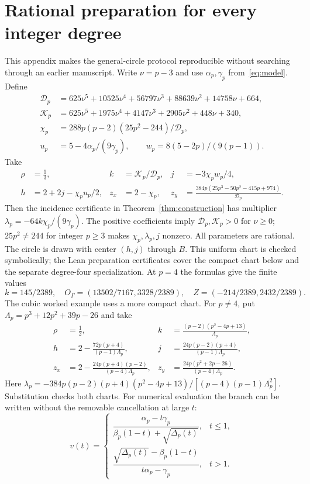 \documentclass[11pt,a4paper]{article}
\begin{document}
\section{Rational preparation for every integer degree}\label{app:prep}
This appendix makes the general-circle protocol reproducible without searching through an earlier manuscript. Write $\nu=p-3$ and use $\alpha_p,\gamma_p$ from~\eqref{eq:model}. Define
\begin{align*}
 \mathcal D_p&=625\nu^5+10525\nu^4+56797\nu^3+88639\nu^2+14758\nu+664,\\
 \mathcal K_p&=625\nu^5+1975\nu^4+4147\nu^3+2905\nu^2+448\nu+340,\\
 \chi_p&=288p(p-2)(25p^2-244)/\mathcal D_p,\\
 u_p&=5-4\alpha_p/(9\gamma_p),\qquad w_p=8(5-2p)/(9(p-1)).
\end{align*}
Take
\begin{align*}
 \rho&=\tfrac13,& k&=\mathcal K_p/\mathcal D_p,& j&=-3\chi_pw_p/4,\\
 h&=2+2j-\chi_pu_p/2,&z_x&=2-\chi_p,&
 z_y&=\frac{384p(25p^3-50p^2-415p+974)}{\mathcal D_p}.
\end{align*}
Then the incidence certificate in Theorem~\ref{thm:construction} has multiplier $\lambda_p=-64k\chi_p/(9\gamma_p)$. The positive coefficients imply $\mathcal D_p,\mathcal K_p>0$ for $\nu\ge0$; $25p^2\ne244$ for integer $p\ge3$ makes $\chi_p,\lambda_p,j$ nonzero. All parameters are rational. The circle is drawn with center $(h,j)$ through $B$. This uniform chart is checked symbolically; the Lean preparation certificates cover the compact chart below and the separate degree-four specialization.
At $p=4$ the formulas give the finite values
\[
 k=145/2389,\quad O_\Gamma=(13502/7167,3328/2389),\quad
 Z=(-214/2389,2432/2389).
\]
The cubic worked example uses a more compact chart. For $p\ne4$, put $\Lambda_p=p^3+12p^2+39p-26$ and take
\begin{align*}
 \rho&=\tfrac12,& k&=\frac{(p-2)(p^2-4p+13)}{\Lambda_p},\\
 h&=2-\frac{72p(p+4)}{(p-1)\Lambda_p},&
 j&=\frac{24p(p-2)(p+4)}{(p-1)\Lambda_p},\\
 z_x&=2-\frac{24p(p+4)(p-2)}{(p-4)\Lambda_p},&
 z_y&=\frac{24p(p^2+2p-26)}{(p-4)\Lambda_p}.
\end{align*}
Here $\lambda_p=-384p(p-2)(p+4)(p^2-4p+13)/[(p-4)(p-1)\Lambda_p^2]$. Substitution checks both charts. For numerical evaluation the branch can be written without the removable cancellation at large $t$:
\[
 v(t)=\begin{cases}
 \dfrac{\alpha_p-t\gamma_p}{\beta_p(1-t)+\sqrt{\Delta_p(t)}},&t\le1,\\[5pt]
 \dfrac{\sqrt{\Delta_p(t)}-\beta_p(1-t)}{t\alpha_p-\gamma_p},&t>1.
 \end{cases}
\]
\begingroup\small\setlength{\bibsep}{1pt}
\endgroup
\end{document}
